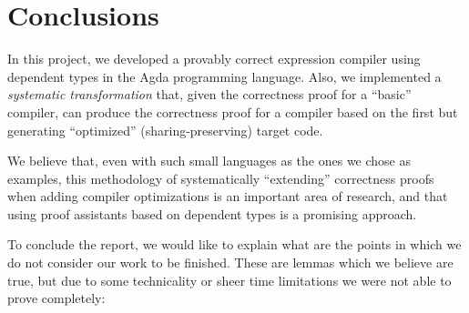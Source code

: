 \documentclass[a4paper]{article}
\begin{document}

          



    \section{Conclusions}
    \label{sec:conclusions}
        In this project, we developed a provably correct expression compiler using dependent types in the Agda programming language.
        Also, we implemented a \emph{systematic transformation} that, given the correctness proof for
        a ``basic'' compiler, can produce the correctness proof for a compiler based on the first but
        generating ``optimized'' (sharing-preserving) target code.

        We believe that, even with such small languages as the ones we chose as examples,
        this methodology of systematically ``extending'' correctness proofs when adding compiler optimizations
        is an important area of research, and that using proof assistants based on dependent types is a
        promising approach.

        To conclude the report, we would like to explain what are the points in which we do not consider our work
        to be finished. These are lemmas which we believe are true, but due to some technicality or sheer
        time limitations we were not able to prove completely:
\end{document}
